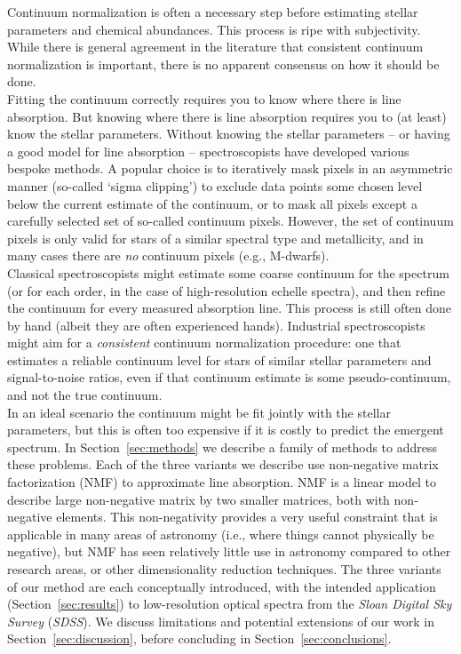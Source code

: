 \documentclass[modern]{aastex631}
\newcommand{\project}[1]{\textit{#1}}
\newcommand{\sdss}{\project{SDSS}}
\begin{document}
Continuum normalization is often a necessary step before estimating stellar parameters and chemical abundances.
This process is ripe with subjectivity.
While there is general agreement in the literature that consistent continuum normalization is important, there is no apparent consensus on how it should be done.\\

Fitting the continuum correctly requires you to know where there is line absorption. But knowing where there is line absorption requires you to (at least) know the stellar parameters. Without knowing the stellar parameters -- or having a good model for line absorption -- spectroscopists have developed various bespoke methods. A popular choice is to iteratively mask pixels in an asymmetric manner (so-called `sigma clipping') to exclude data points some chosen level below the current estimate of the continuum, or to mask all pixels except a carefully selected set of so-called continuum pixels. However, the set of continuum pixels is only valid for stars of a similar spectral type and metallicity, and in many cases there are \emph{no} continuum pixels (e.g., M-dwarfs).\\

Classical spectroscopists might estimate some coarse continuum for the spectrum (or for each order, in the case of high-resolution echelle spectra), and then refine the continuum for every measured absorption line. This process is still often done by hand (albeit they are often experienced hands). Industrial spectroscopists might aim for a \emph{consistent} continuum normalization procedure: one that estimates a reliable continuum level for stars of similar stellar parameters and signal-to-noise ratios, even if that continuum estimate is some pseudo-continuum, and not the true continuum.\\

In an ideal scenario the continuum might be fit jointly with the stellar parameters, but this is often too expensive if it is costly to predict the emergent spectrum. In Section~\ref{sec:methods} we describe a family of methods to address these problems. Each of the three variants we describe use non-negative matrix factorization (NMF) to approximate line absorption. NMF is a linear model to describe large non-negative matrix by two smaller matrices, both with non-negative elements. This non-negativity provides a very useful constraint that is applicable in many areas of astronomy (i.e., where things cannot physically be negative), but NMF has seen relatively little use in astronomy compared to other research areas, or other dimensionality reduction techniques. The three variants of our method are each conceptually introduced, with the intended application (Section~\ref{sec:results}) to low-resolution optical spectra from the \project{Sloan Digital Sky Survey} (\sdss). We discuss limitations and potential extensions of our work in Section~\ref{sec:discussion}, before concluding in Section~\ref{sec:conclusions}.\\
\end{document}
